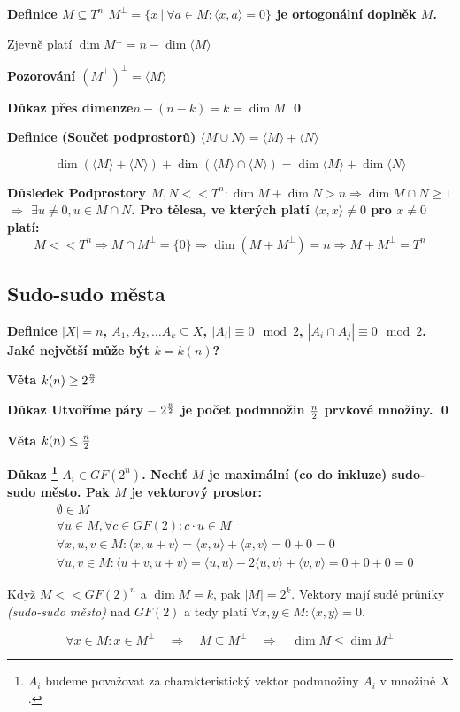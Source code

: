 \documentclass[a4paper,12pt,titlepage]{article}
\newcommand{\dk}{\smallskip\noindent\bf Důkaz\rm{} }
\newcommand{\df}{\smallskip\noindent\bf Definice\rm{} }
\newcommand{\vt}{\smallskip\noindent\bf Věta\rm{} }
\newcommand{\poz}{\smallskip\noindent\bf Pozorování\rm{} }
\newcommand{\dsl}{\smallskip\noindent\bf Důsledek\rm{} }
\newcommand{\sk}[1]{{\langle #1\rangle}}
\begin{document}
\df $M \subseteq T^n$ \quad $M^\bot = \{x\ |\ \forall a\in M: \sk{x,a} = 0\}$ je ortogonální doplněk $M$.

Zjevně platí $\dim M^\bot = n - \dim \sk M$

\poz ${(M^\bot)}^\bot = \sk M$

\dk přes dimenze\quad $n-(n-k) = k = \dim M$ \qed

\df (Součet podprostorů) $\sk{M\cup N} = \sk M + \sk N$

$$\dim\left(\sk M + \sk N\right) + \dim\left(\sk M \cap \sk N\right) = \dim \sk M + \dim \sk N$$

\dsl Podprostory $M,N << T^n: \dim M + \dim N > n \Rightarrow \dim M \cap N \ge 1$ $\Rightarrow$ $\exists u \neq 0, u \in M\cap N$.
Pro tělesa, ve kterých platí $\sk{x,x} \neq 0$ pro $x\neq 0$ platí:
$$M << T^n \Rightarrow M\cap M^\bot = \{0\} \Rightarrow \dim(M+M^\bot) = n \Rightarrow M + M^\bot = T^n$$

\subsection{Sudo-sudo města}

\df $|X| = n$, $A_1, A_2, \dots A_k \subseteq X$, $|A_i| \equiv 0 \mod 2$, $|A_i\cap A_j| \equiv 0 \mod 2$. Jaké největší může být $k = k(n)$?

\vt $k(n) \ge 2^{n\over 2}$

\dk Utvoříme páry -- $2^{n\over 2}$ je počet podmnožin $n\over 2$ prvkové množiny. \qed

\vt $k(n) \le {n\over 2}$

\dk\footnote{$A_i$ budeme považovat za charakteristický vektor podmnožiny $A_i$
v množině $X$.} $A_i \in GF(2^n)$. Nechť $M$ je maximální (co do inkluze)
sudo-sudo město. Pak $M$ je vektorový prostor:
\begin{align}
	&\emptyset \in M \\
	&\forall u \in M, \forall c\in GF(2): c\cdot u \in M \\
	&\forall x,u,v\in M: \sk{x, u+v} = \sk{x,u} + \sk{x,v} = 0 + 0 = 0 \\
	&\forall u,v \in M: \sk{u+v,u+v} = \sk{u,u} + 2\sk{u,v} + \sk{v,v} = 0 + 0 + 0 = 0
\end{align}

Když $M << GF(2)^n$ a $\dim M = k$, pak $|M| = 2^k$. Vektory mají sudé průniky {\it (sudo-sudo město)} nad $GF(2)$ a tedy platí $\forall x,y\in M: \sk{x,y} = 0$.

$$\forall x\in M: x\in M^\bot \quad\Rightarrow\quad M\subseteq M^\bot \quad\Rightarrow\quad \dim M \le \dim M^\bot$$
\end{document}
